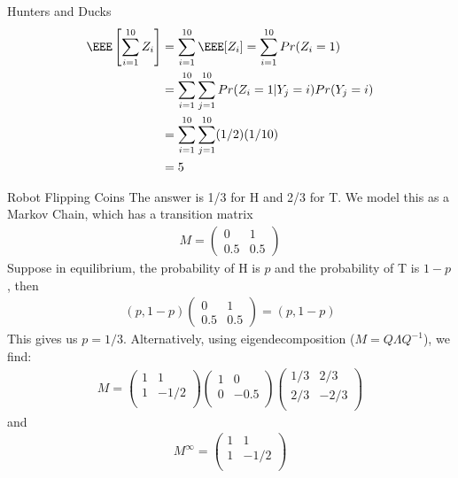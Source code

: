 \documentclass[oldfontcommands]{memoir}
\begin{document}
{\begin{answer}{Hunters and Ducks}
\begin{align*}
    \EEE\left[\sum_{i=1}^{10} Z_i\right] &= \sum_{i=1}^{10} \EEE[Z_i] = \sum_{i=1}^{10} Pr(Z_i=1)\\
    &= \sum_{i=1}^{10} \sum_{j=1}^{10} Pr(Z_i=1|Y_j = i) Pr(Y_j = i)\\
    &= \sum_{i=1}^{10} \sum_{j=1}^{10} (1/2)(1/10)\\
    &= 5		
\end{align*}\end{answer}
\begin{answer}{Robot Flipping Coins}
The answer is 1/3 for H and 2/3 for T. We model this as a Markov Chain, which has a transition matrix
\begin{align*}
    M = 
    \begin{pmatrix}
        0 & 1\\
        0.5 & 0.5
    \end{pmatrix}	
\end{align*}
Suppose in equilibrium, the probability of H is $p$ and the probability of T is $1-p$, then
\begin{align*}
    (p, 1-p) 
    \begin{pmatrix}
        0 & 1\\
        0.5 & 0.5
    \end{pmatrix}
    =
    (p, 1-p)
\end{align*}
This gives us $p = 1/3$. Alternatively, using eigendecomposition ($M = Q \Lambda Q^{-1}$), we find:
\begin{align*}
    M = 
    \begin{pmatrix}
    1 & 1\\
    1 & -1/2\\		
    \end{pmatrix}
    \begin{pmatrix}
    1 & 0\\
    0 & -0.5\\		
    \end{pmatrix}
    \begin{pmatrix}
    1/3 & 2/3\\
    2/3 & -2/3\\		
    \end{pmatrix}
\end{align*}
and 
\begin{align*}
    M^\infty = 
    \begin{pmatrix}
    1 & 1\\
    1 & -1/2\\		
    \end{pmatrix}

\end{align*}
\end{answer}}
\end{document}
